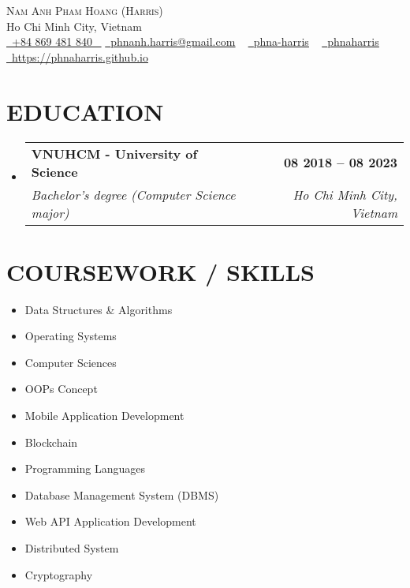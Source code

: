\documentclass[letterpaper,11pt]{article}
\makeatletter
\newcommand{\resumeSubheading}[4]{
	\vspace{-2pt}\item
	\begin{tabular*}{1.0\textwidth}[t]{l@{\extracolsep{\fill}}r}
		\textbf{\large#1} & \textbf{\small #2} \\
		\textit{\large#3} & \textit{\small #4} \\

	\end{tabular*}\vspace{-7pt}
}
\newcommand{\resumeSubHeadingListStart}{\begin{itemize}[leftmargin=0.0in, label={}]}
\newcommand{\resumeSubHeadingListEnd}{\end{itemize}}
\makeatother
\begin{document}

\begin{center}
	{\Huge \scshape Nam Anh Pham Hoang (Harris)} \\ \vspace{1pt}
	Ho Chi Minh City, Vietnam \\ \vspace{1pt}
	\small \href{tel:+84 869 481 840}{ \raisebox{-0.1\height}\faPhone\ \underline{+84 869 481 840} ~}
	\href{mailto:phnanh.harris@gmail.com}{\raisebox{-0.2\height}\faEnvelope\  \underline{phnanh.harris@gmail.com}} ~
	\href{https://linkedin.com/in/phnaharris}{\raisebox{-0.2\height}\faLinkedinSquare\ \underline{phna-harris}}  ~
	\href{https://github.com/phnaharris}{\raisebox{-0.2\height}\faGithub\ \underline{phnaharris}} ~
	\href{https://phnaharris.github.io}{\raisebox{-0.2\height}\faGlobe\  \underline{https://phnaharris.github.io}} ~
	\vspace{-8pt}
\end{center}


\section{EDUCATION}
\resumeSubHeadingListStart
\resumeSubheading
{VNUHCM - University of Science}{08 2018 -- 08 2023}
{Bachelor's degree (Computer Science major)}{Ho Chi Minh City, Vietnam}
\resumeSubHeadingListEnd


\section{COURSEWORK / SKILLS}
\begin{multicols}{4}
	\begin{itemize}[itemsep=-2pt, parsep=5pt]
		\item Data Structures \& Algorithms
		\item Operating Systems
		\item Computer Sciences
		\item OOPs Concept
		\item Mobile Application Development
		\item Blockchain
		\item Programming Languages
		\item Database Management System (DBMS)
		\item Web API Application Development
		\item Distributed System
		\item Cryptography
	\end{itemize}
\end{multicols}
\vspace*{2.0\multicolsep}
\end{document}
